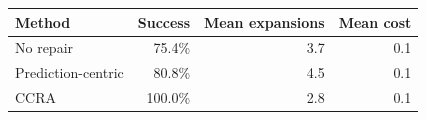 \begin{tabular}{lrrr}
\toprule
Method & Success & Mean expansions & Mean cost \\
\midrule
No repair & 75.4\% & 3.7 & 0.1 \\
Prediction-centric & 80.8\% & 4.5 & 0.1 \\
CCRA & 100.0\% & 2.8 & 0.1 \\
\bottomrule
\end{tabular}
